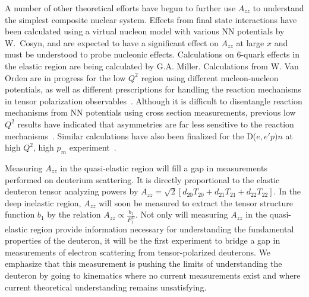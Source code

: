 A number of other theoretical efforts have begun to further use $A_{zz}$ to understand the simplest composite nuclear system. Effects from final state interactions have been calculated using a virtual nucleon model with various NN potentials by W.~Cosyn, and are expected to have a significant effect on $A_{zz}$ at large $x$ and must be understood to probe nucleonic effects. Calculations on 6-quark effects in the elastic region are being calculated by G.A. Miller. Calculations from W. Van Orden are in progress for the low $Q^2$ region using different nucleon-nucleon potentials, as well as different prescriptions for handling the reaction mechanisms in tensor polarization observables~\cite{vanorden-convo}. Although it is difficult to disentangle reaction mechanisms from NN potentials using cross section measurements, previous low $Q^2$ results have indicated that asymmetries are far less sensitive to the reaction mechanisms~\cite{Passchier:2001uc}. Similar calculations have also been finalized for the D($e,e'p)n$ at high $Q^2$, high $p_m$ experiment~\cite{Ford:2014yua}. 



Measuring $A_{zz}$ in the quasi-elastic region will fill a gap in measurements performed on deuterium scattering. It is directly proportional to the elastic deuteron tensor analyzing powers by $A_{zz} = \sqrt{2} \left[ d_{20} T_{20} + d_{21} T_{21} + d_{22} T_{22}\right]$. 
In the deep inelastic region, $A_{zz}$ will soon be measured to extract the tensor structure function $b_1$ by the relation $A_{zz} \propto \frac{b_1}{F_1^D}$. Not only will measuring $A_{zz}$ in the quasi-elastic region provide information necessary for understanding the fundamental properties of the deuteron, it will be the first experiment to bridge a gap in measurements of electron scattering from tensor-polarized deuterons. We emphasize that this measurement is pushing the limits of understanding the deuteron by going to kinematics where no current measurements exist and where current theoretical understanding remains unsatisfying.



